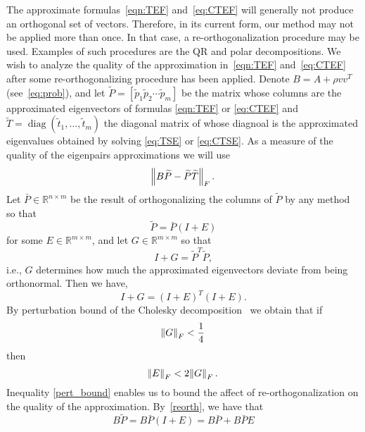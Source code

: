 \documentclass[11pt]{article}
\DeclareMathOperator{\diag}{diag}
\begin{document}
The approximate formulas~\eqref{eqn:TEF} and~\eqref{eq:CTEF} will generally not produce an orthogonal set of vectors. Therefore, in its current form, our method may not be applied more than once. In that case, a re-orthogonalization procedure may be used. Examples of such procedures are the QR and polar decompositions. We wish to analyze the quality of the approximation in~\eqref{eqn:TEF} and~\eqref{eq:CTEF} after some re-orthogonalizing procedure has been applied.
Denote $B = A + \rho vv^T$ (see~\eqref{eq:prob}), and let $\widetilde{P} = [\widetilde{p}_1\widetilde{p}_2 \cdots \widetilde{p}_m]$ be the matrix whose columns are the approximated eigenvectors of formulas \eqref{eqn:TEF} or \eqref{eq:CTEF} and $\widetilde{T} = \diag (\widetilde{t}_1,...,\widetilde{t}_m)$ the diagonal matrix of whose diagnoal is the approximated eigenvalues obtained by solving \eqref{eq:TSE} or \eqref{eq:CTSE}. As a measure of the quality of the eigenpairs approximations we will use
\begin{equation}
\norm{B\widetilde{P} - \widetilde{P}\widetilde{T}}_F.
\end{equation}
Let $\bar{P} \in \mathbb{R}^{n \times m}$ be the result of orthogonalizing the columns of $\widetilde{P}$ by any method so that
\begin{equation} \label{reorth}
\widetilde{P} = \bar{P}(I + E)
\end{equation}
for some  $E \in \mathbb{R}^{m \times m}$, and let $G \in \mathbb{R}^{m \times m}$ so that
\begin{equation}
I + G = \widetilde{P}^T\widetilde{P},
\end{equation}
i.e., $G$ determines how much the approximated eigenvectors deviate from being orthonormal. Then we have,
\begin{equation}
I + G = (I + E)^T(I + E).
\end{equation}
By perturbation bound of the Cholesky decomposition~\cite[Theorem 9]{chang1996new} we obtain that if 
\begin{equation} \label{pert_cond}
\norm{G}_F < \frac14
\end{equation}
then
\begin{equation} \label{pert_bound}
\norm{E}_F < 2 \norm{G}_F.
\end{equation}
Inequality \eqref{pert_bound} enables us to bound the affect of re-orthogonalization on the quality of the approximation. By~\eqref{reorth}, we have that
\begin{equation} \label{eq:BP}
B\widetilde{P} = B \bar{P}(I + E)= B \bar{P} + B \bar{P}E
\end{equation}
\end{document}
